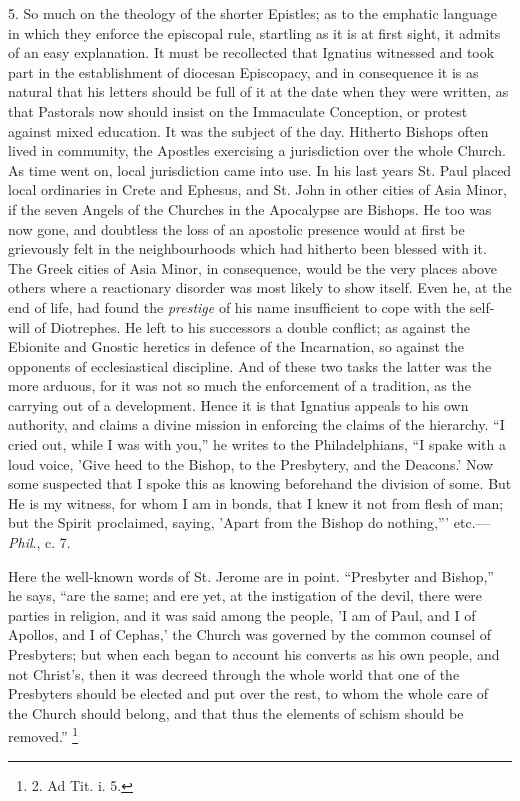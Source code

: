 5. So much on the theology of
the shorter Epistles; as to the emphatic language in which they
enforce the episcopal rule, startling as it is at first sight, it
admits of an easy explanation. It must be recollected that Ignatius
witnessed and took part in the establishment of diocesan Episcopacy,
and in consequence it is as natural that his letters should be full of
it at the date when they were written, as that Pastorals now should
insist on the Immaculate Conception, or protest against mixed
education. It was the subject of the day. Hitherto Bishops often lived
in community, the Apostles exercising a jurisdiction over the whole
Church. As time went on, local jurisdiction came into use. In his last
years St. Paul placed local ordinaries in Crete and Ephesus, and St. John in other cities of Asia Minor, if the seven Angels of the
Churches in the Apocalypse are Bishops. He too was now gone, and
doubtless the loss of an apostolic presence would at first be
grievously felt in the neighbourhoods which had hitherto been blessed
with it. The Greek cities of Asia Minor, in consequence, would be the
very places above others where a reactionary disorder was most likely
to show itself. Even he, at the end of life, had found the \emph{prestige}
of his name insufficient to cope with the self-will of Diotrephes. He
left to his successors a double conflict; as against the Ebionite and
Gnostic heretics in defence of the Incarnation, so against the
opponents of ecclesiastical discipline. And of these two tasks the
latter was the more arduous, for it was not so much the enforcement of
a tradition, as the carrying out of a development. Hence it is that
Ignatius appeals to his own authority, and claims a divine mission in
enforcing the claims of the hierarchy. ``I cried out, while I was with
you,'' he writes to the Philadelphians, ``I spake with a loud voice,
'Give heed to the Bishop, to the Presbytery, and the Deacons.' Now
some suspected that I spoke this as knowing beforehand the division of
some. But He is my witness, for whom I am in bonds, that I knew it not
from flesh of man; but the Spirit proclaimed, saying, 'Apart from the
Bishop do nothing,''' etc.—\emph{Phil}., c. 7.

Here the well-known words of
St. Jerome are in point. ``Presbyter and Bishop,'' he says, ``are the
same; and ere yet, at the instigation of the devil, there were parties
in religion, and it was said among the people, 'I am of Paul,
and I of Apollos, and I of Cephas,' the Church was governed by the
common counsel of Presbyters; but when each began to account his
converts as his own people, and not Christ's, then it was decreed
through the whole world that one of the Presbyters should be elected
and put over the rest, to whom the whole care of the Church should
belong, and that thus the elements of schism should be removed.'' \footnote{2.
Ad Tit. i. 5.}

